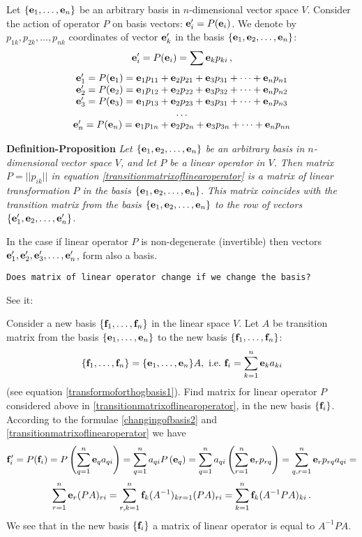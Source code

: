 \documentclass[12pt]{article}
\numberwithin{equation}{section}
\begin{document}
Let $\{{\bf e}_1,\dots,{\bf e}_n\}$ be an arbitrary  basis in $n$-dimensional vector space $V$.
Consider the action of operator $P$ on basis vectors:  
${\bf e}'_i=P({\bf e}_i)$. We denote by $p_{1k},p_{2k},\dots,p_{nk}$ 
coordinates of vector ${\bf e}_k'$ in the basis 
$\{{\bf e}_1,{\bf e}_2,\dots,{\bf e}_n\}$:
             $$
{\bf e}'_i=P({\bf e}_i)=\sum {\bf e}_kp_{ki}\,,
           $$ 
                \begin{equation}
    \label{transitionmatrixoflinearoperator}
                  \begin{matrix}
 {\bf e}'_1=P({\bf e}_1)={\bf e}_1 p_{11}+{\bf e}_2 p_{21}+{\bf e}_3 p_{31}+
\dots+{\bf e}_n p_{n1}\cr
 {\bf e}'_2 =P({\bf e}_2)={\bf e}_1 p_{12}+{\bf e}_2 p_{22}+{\bf e}_3 p_{32}+
\dots+{\bf e}_n p_{n2}\cr
 {\bf e}'_3 =P({\bf e}_3)={\bf e}_1 p_{13}+{\bf e}_2 p_{23}+{\bf e}_3 p_{31}+
\dots+{\bf e}_n p_{n3}\cr
     \ldots\cr
  {\bf e}'_n = P({\bf e}_n)={\bf e}_1 p_{1n}+{\bf e}_2 p_{2n}+{\bf e}_3 p_{3n}+
\dots+{\bf e}_n p_{nn}\cr                         \end{matrix}
                 \end{equation}

{\bf Definition-Proposition}  
{\it Let $\{{\bf e}_1,{\bf e}_2,\dots,{\bf e}_n\}$ be an arbitrary basis in 
$n$-dimensional vector space $V$, and 
let $P$ be a linear operator
in $V$. Then matrix  $P=||p_{ik}||$ in equation
\eqref{transitionmatrixoflinearoperator}
 is a matrix of {\it linear transformation $P$ in the basis
 $\{{\bf e}_1,{\bf e}_2,\dots,{\bf e}_n\}$.}
  This matrix coincides with the transition matrix from the basis
  $\{{\bf e}_1,{\bf e}_2,\dots,{\bf e}_n\}$ to the row of vectors
$\{{\bf e}'_1,{\bf e}_2,\dots,{\bf e}'_n\}$.
}
\m

In the case if linear operator $P$ is 
non-degenerate (invertible) then
  vectors  ${{\bf e}'_1,{\bf e}'_2,{\bf e}'_3,\dots,{\bf e}'_n}$,
 form also a basis.

\smallskip

 \centerline 
{\tt Does matrix of linear operator change if we change the basis?}

   See it:

 
Consider a new basis $\{{\bf f}_1,\dots,{\bf f}_n\}$ 
in the linear space $V$.
  Let $A$ be transition matrix from the 
basis $\{{\bf e}_1,\dots,{\bf e}_n\}$
to the new basis $\{{\bf f}_1,\dots,{\bf f}_n\}$:
               \begin{equation}\label{changingofbasis2}
\{{\bf f}_1,\dots,{\bf f}_n\}=\{{\bf e}_1,\dots,{\bf e}_n\}A,\,\,{\rm i.e.}
     \,\, {\bf f}_i=\sum_{k=1}^n{\bf e}_k a_{ki}
               \end{equation}
 (see equation \eqref{transformoforthogbasis1}).
 Find matrix for  linear operator $P$ 
considered above in  \eqref{transitionmatrixoflinearoperator},
  in the new basis $\{{\bf f}_i\}$.
According to the formulae \eqref{changingofbasis2} and
\eqref{transitionmatrixoflinearoperator} we have
          $$
   {\bf f}'_i=P({\bf f}_i)=
 P\left(\sum_{q=1}^n{\bf e}_q a_{qi}\right)=
 \sum_{q=1}^n a_{qi}P\left({\bf e}_q\right)=
     \sum_{q=1}^n a_{qi}\left(\sum_{r=1}^n{\bf e}_r p_{rq}\right)=
     \sum_{q,r=1}^n{\bf e}_r p_{rq}a_{qi}=         
           $$
         $$
\sum_{r=1}^n{\bf e}_r (PA)_{ri}=
    \sum_{r,k=1}^n{\bf f}_{k}(A^{-1})_{kr=1}(PA)_{ri}=
\sum_{k=1}^n {\bf f}_k(A^{-1}PA)_{ki}\,.
      $$
We see that in the new basis $\{{\bf f}_i\}$
a matrix of linear operator is equal to $A^{-1}PA$.
\end{document}
